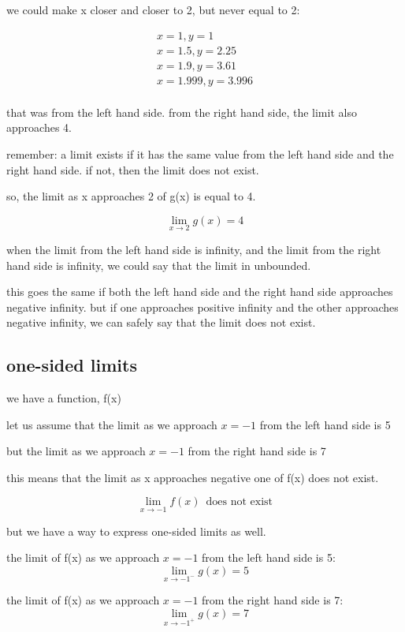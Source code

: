 \documentclass[11pt,a4paper]{article}
\begin{document}
we could make x closer and closer to 2, but never equal to 2:

$$\begin{array}{l}
  x=1,y=1\\
  x=1.5,y=2.25\\
  x=1.9,y=3.61\\
  x=1.999,y=3.996\\
\end{array}$$

that was from the left hand side. from the right hand side, the limit also approaches 4.

remember: a limit exists if it has the same value from the left hand side and the right hand side. if not, then the limit does not exist.

so, the limit as x approaches 2 of g(x) is equal to 4.

$$\lim \limits_{x \to 2} g(x) = 4$$

\vspace{30pt}

when the limit from the left hand side is infinity, and the limit from the right hand side is infinity, we could say that the limit in unbounded.

this goes the same if both the left hand side and the right hand side approaches negative infinity. but if one approaches positive infinity and the other approaches negative infinity, we can safely say that the limit does not exist.


\subsection{one-sided limits}

we have a function, f(x)

let us assume that the limit as we approach $x=-1$ from the left hand side is 5

but the limit as we approach $x=-1$ from the right hand side is 7

this means that the limit as x approaches negative one of f(x) does not exist.

$$\lim \limits_{x \to -1} f(x) \,\,\, \text{does not exist}$$

but we have a way to express one-sided limits as well.

the limit of f(x) as we approach $x=-1$ from the left hand side is 5:
$$\lim \limits_{x \to -1^-} g(x) = 5$$

the limit of f(x) as we approach $x=-1$ from the right hand side is 7:
$$\lim \limits_{x \to -1^+} g(x) = 7$$
\end{document}
